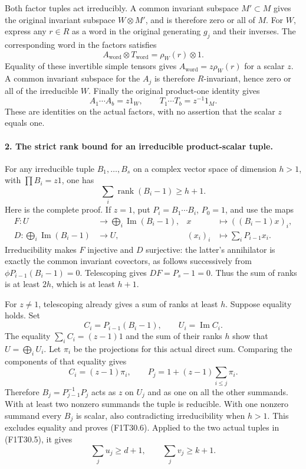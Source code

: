 Both factor tuples act irreducibly. A common invariant
subspace \(M'\subset M\) gives the original invariant
subspace \(W\otimes M'\), and is therefore zero or all
of \(M\). For \(W\), express any \(r\in R\) as a word
in the original generating \(g_j\) and their inverses.
The corresponding word in the factors satisfies
\[
 A_{\mathrm{word}}\otimes T_{\mathrm{word}}
                       =\rho_W(r)\otimes1.
\]
Equality of these invertible simple tensors gives
\(A_{\mathrm{word}}=z\rho_W(r)\) for a scalar \(z\).
A common invariant subspace for the \(A_j\) is therefore
\(R\)-invariant, hence zero or all of the irreducible
\(W\). Finally the original product-one identity gives
\[
             A_1\cdots A_b=z1_W,\qquad
             T_1\cdots T_b=z^{-1}1_M .
 \tag{F1T30.5}
\]
These are identities on the actual factors, with no
assertion that the scalar \(z\) equals one.

\paragraph{2. The strict rank bound for an irreducible product-scalar tuple.}
For any irreducible tuple \(B_1,\ldots,B_s\) on a
complex vector space of dimension \(h>1\), with
\(\prod B_i=z1\), one has
\[
                \sum_i\operatorname{rank}(B_i-1)\ge h+1.
 \tag{F1T30.6}
\]
Here is the complete proof. If \(z=1\), put
\(P_i=B_1\cdots B_i\), \(P_0=1\), and use the maps
\[
 \begin{aligned}
 F:U&\longrightarrow\bigoplus_i\operatorname{Im}(B_i-1),
       &x&\longmapsto((B_i-1)x)_i,\\
 D:\bigoplus_i\operatorname{Im}(B_i-1)&\longrightarrow U,
       &(x_i)_i&\longmapsto\sum_iP_{i-1}x_i .
 \end{aligned}
\]
Irreducibility makes \(F\) injective and \(D\) surjective:
the latter's annihilator is exactly the common invariant
covectors, as follows successively from
\(\phi P_{i-1}(B_i-1)=0\).
Telescoping gives \(DF=P_s-1=0\). Thus the sum of ranks
is at least \(2h\), which is at least \(h+1\).

For \(z\ne1\), telescoping already gives a sum of ranks
at least \(h\). Suppose equality holds. Set
\[
 C_i=P_{i-1}(B_i-1),\qquad U_i=\operatorname{Im}C_i.
\]
The equality \(\sum_i C_i=(z-1)1\) and the sum of their
ranks \(h\) show that \(U=\bigoplus_iU_i\).
Let \(\pi_i\) be the projections for this actual direct
sum. Comparing the components of that equality gives
\[
 C_i=(z-1)\pi_i,\qquad
 P_j=1+(z-1)\sum_{i\le j}\pi_i.
\]
Therefore \(B_j=P_{j-1}^{-1}P_j\) acts as \(z\) on
\(U_j\) and as one on all the other summands.
With at least two nonzero summands the tuple is
reducible. With one nonzero summand every \(B_j\) is
scalar, also contradicting irreducibility when \(h>1\).
This excludes equality and proves (F1T30.6).
Applied to the two actual tuples in (F1T30.5), it gives
\[
                  \sum_j u_j\ge d+1,\qquad
                  \sum_j v_j\ge k+1.
 \tag{F1T30.7}
\]


